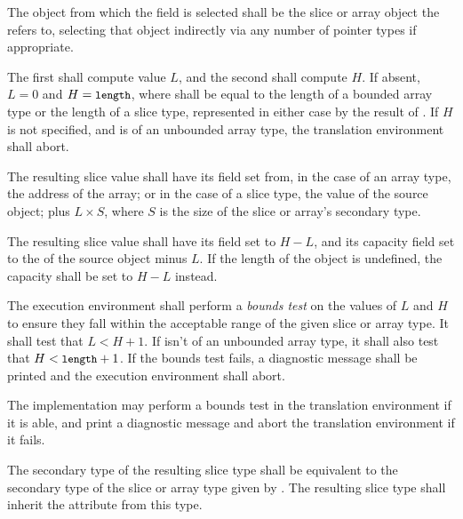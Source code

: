 
\specsubsubitem
The object from which the field is selected shall be the slice or array object
the  refers to, selecting that object indirectly
via any number of pointer types if appropriate.

\specsubsubitem
The first  shall compute value $L$, and the second shall
compute $H$. If absent, $L = 0$ and $H = \mbox{\textup{\small\texttt{length}}}$, where 
shall be equal to the length of a bounded array type or the length of a slice
type, represented in either case by the result of
. If $H$ is not specified, and
 is of an unbounded array type, the translation
environment shall abort.

\specsubsubitem
The resulting slice value shall have its  field set from, in the case
of an array type, the address of the array; or in the case of a slice type, the
 value of the source object; plus $L \times S$, where $S$ is the
size of the slice or array's secondary type.

\specsubsubitem
The resulting slice value shall have its  field set to $H - L$,
and its capacity field set to the  of the source object minus $L$.
If the length of the object is undefined, the capacity shall be set to $H - L$
instead.

\specsubsubitem
The execution environment shall perform a \textit{bounds test} on the values of
$L$ and $H$ to ensure they fall within the acceptable range of the given slice
or array type. It shall test that $L < H+1$. If 
isn't of an unbounded array type, it shall also test that $H < \mbox{\textup{\small\texttt{length}}}+1$.
If the bounds test fails, a diagnostic message shall be printed and the
execution environment shall abort.

The implementation may perform a bounds test in the translation environment if
it is able, and print a diagnostic message and abort the translation environment
if it fails.

\specsubsubitem
The secondary type of the resulting slice type shall be equivalent to the
secondary type of the slice or array type given by
. The resulting slice type shall inherit the
 attribute from this type.

